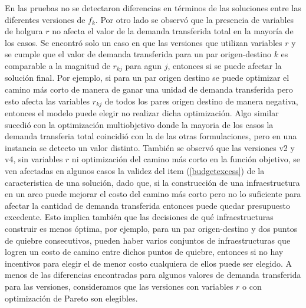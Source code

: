 \documentclass{article}
\begin{document}
  En las pruebas no se detectaron diferencias en términos de las soluciones entre las diferentes versiones de $f_k$. Por otro lado se observó que la presencia de variables de holgura $r$ no afecta el valor de la demanda transferida total en la mayoría de los casos. Se encontró solo un caso en que las versiones que utilizan variables $r$ y se cumple que el valor de demanda transferida para un par origen-destino $k$ es comparable a la magnitud de $r_{kj}$ para agun $j$, entonces si se puede afectar la solución final. Por ejemplo, si para un par origen destino se puede optimizar el camino más corto de manera de ganar una unidad de demanda transferida pero esto afecta las variables $r_{kj}$ de todos los pares origen destino de manera negativa, entonces el modelo puede elegir no realizar dicha optimización.
  Algo similar sucedió con la optimización multiobjetivo donde la mayoria de los casos la demanda transferia total coincidió con la de las otras formulaciones, pero en una instancia se detecto un valor distinto.
  También se observó que las versiones v2 y v4, sin variables $r$ ni optimización del camino más corto en la función objetivo, se ven afectadas en algunos casos la validez del item (\ref{budgetexcess}) de la caracteristica de una solución, dado que, si la construcción de una infraestructura en un arco puede mejorar el costo del camino más corto pero no lo suficiente para afectar la cantidad de demanda transferida entonces puede quedar presupuesto excedente. Esto implica también que las decisiones de qué infraestructuras construir es menos óptima, por ejemplo, para un par origen-destino y dos puntos de quiebre consecutivos, pueden haber varios conjuntos de infraestructuras que logren un costo de camino entre dichos puntos de quiebre, entonces si no hay incentivos para elegir el de menor costo cualquiera de ellos puede ser elegido.
  A menos de las diferencias encontradas para algunos valores de demanda transferida para las versiones, consideramos que las versiones con variables $r$ o con optimización de Pareto son elegibles.
\end{document}
